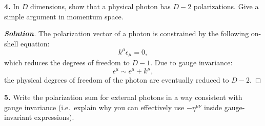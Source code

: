 \documentclass[11pt]{article}
\newenvironment{solution}[1][]{\begin{proof}[\textbf{Solution}]}{\end{proof}}
\begin{document}
\begin{tcolorbox}[problem]
\textbf{4.} In $D$ dimensions, show that a physical photon has $D-2$ polarizations. Give a simple argument in momentum space.
\end{tcolorbox}
\begin{solution}[14.4]
	The polarization vector of a photon is constrained by the following on-shell equation:
	\[
	k^\mu \epsilon_\mu = 0,
	\]
	which reduces the degrees of freedom to $D-1$. Due to gauge invariance:
	\[
	\epsilon^\mu \sim \epsilon^\mu + k^\mu,
	\]
	the physical degrees of freedom of the photon are eventually reduced to $D-2$.
\end{solution}
\begin{tcolorbox}[problem]
\textbf{5.} Write the polarization sum for external photons in a way consistent with gauge invariance (i.e.\ explain why you can effectively use $-\eta^{\mu\nu}$ inside gauge-invariant expressions).
\end{tcolorbox}
\end{document}
